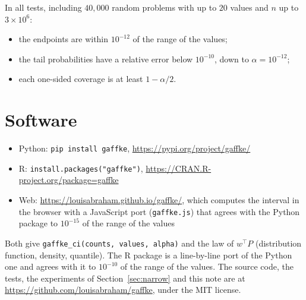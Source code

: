 \documentclass[11pt]{article}
\begin{document}
In all tests, including $40{,}000$ random problems with up to $20$ values and $n$ up to $3 \times 10^6$:
\begin{itemize}[nosep]
  \item the endpoints are within $10^{-12}$ of the range of the values;
  \item the tail probabilities have a relative error below $10^{-10}$, down to $\alpha = 10^{-12}$;
  \item each one-sided coverage is at least $1 - \alpha/2$.
\end{itemize}

\section*{Software}

\begin{itemize}[nosep]
  \item Python: \texttt{pip install gaffke}, \url{https://pypi.org/project/gaffke/}
  \item R: \texttt{install.packages("gaffke")}, \url{https://CRAN.R-project.org/package=gaffke}
  \item Web: \url{https://louisabraham.github.io/gaffke/}, which computes the interval in the browser with a JavaScript port (\texttt{gaffke.js}) that agrees with the Python package to $10^{-15}$ of the range of the values
\end{itemize}
Both give \texttt{gaffke\_ci(counts, values, alpha)} and the law of $w^\top P$ (distribution function, density, quantile).
The R package is a line-by-line port of the Python one and agrees with it to $10^{-10}$ of the range of the values.
The source code, the tests, the experiments of Section~\ref{sec:narrow} and this note are at \url{https://github.com/louisabraham/gaffke}, under the MIT license.
\end{document}
